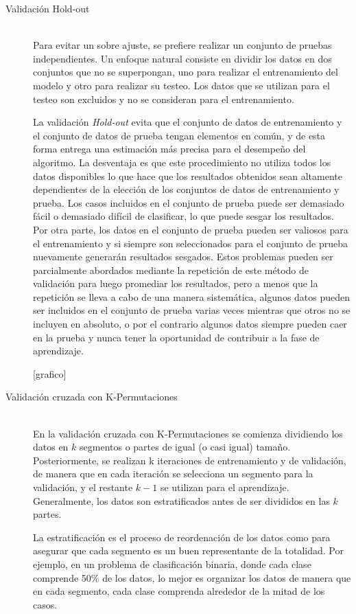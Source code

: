     \begin{description}
      \item[Validación Hold-out] \hfill \\
      Para evitar un sobre ajuste, se prefiere realizar un conjunto de pruebas independientes. Un enfoque natural consiste en dividir los datos en dos conjuntos que no se superpongan, uno para realizar el entrenamiento del modelo y otro para realizar su testeo. Los datos que se utilizan para el testeo son excluidos y no se consideran para el entrenamiento. 
      
      La validación \textit{Hold-out} evita que el conjunto de datos de entrenamiento y el conjunto de datos de prueba tengan elementos en común, y de esta forma entrega una estimación más precisa para el desempeño del algoritmo. La desventaja es que este procedimiento no utiliza todos los datos disponibles lo que hace que los resultados obtenidos sean altamente dependientes de la elección de los conjuntos de datos de entrenamiento y prueba. Los casos incluidos en el conjunto de prueba puede ser demasiado fácil o demasiado difícil de clasificar, lo que puede sesgar los resultados. Por otra parte, los datos en el conjunto de prueba pueden ser valiosos para el entrenamiento y si siempre son seleccionados para el conjunto de prueba nuevamente generarán resultados sesgados. Estos problemas pueden ser parcialmente abordados mediante la repetición de este método de validación para luego promediar los resultados, pero a menos que la repetición se lleva a cabo de una manera sistemática, algunos datos pueden ser incluidos en el conjunto de prueba varias veces mientras que otros no se incluyen en absoluto, o por el contrario algunos datos siempre pueden caer en la prueba y nunca tener la oportunidad de contribuir a la fase de aprendizaje. 
      
      [grafico]
      
      \item[Validación cruzada con K-Permutaciones] \hfill \\
      En la validación cruzada con K-Permutaciones se comienza dividiendo los datos en $k$ segmentos o partes de igual (o casi igual) tamaño. Posteriormente, se realizan k iteraciones de entrenamiento y de validación, de manera que en cada iteración se selecciona un segmento para la validación, y el restante $k-1$ se utilizan para el aprendizaje. Generalmente, los datos son estratificados antes de ser divididos en las $k$ partes.
      
      La estratificación es el proceso de reordenación de los datos como para asegurar que cada segmento es un buen representante de la totalidad. Por ejemplo, en un problema de clasificación binaria, donde cada clase comprende 50\% de los datos, lo mejor es organizar los datos de manera que en cada segmento, cada clase comprenda alrededor de la mitad de los casos.
      

\end{description}
